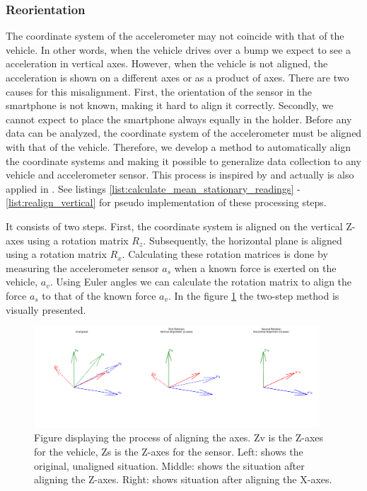 \subsubsection{Reorientation}
\label{sec:reorientation}

The coordinate system of the accelerometer may not coincide with that of the vehicle. In other words, when the vehicle drives over a bump we expect to see a acceleration in vertical axes. However, when the vehicle is not aligned, the acceleration is shown on a different axes or as a product of axes. There are two causes for this misalignment. First, the orientation of the sensor in the smartphone is not known, making it hard to align it correctly. Secondly, we cannot expect to place the smartphone always equally in the holder. Before any data can be analyzed, the coordinate system of the accelerometer must be aligned with that of the vehicle. Therefore, we develop a method to automatically align the coordinate systems and making it possible to generalize data collection to any vehicle and accelerometer sensor. This process is inspired by  and actually is also applied in . See listings \ref{list:calculate_mean_stationary_readings} - \ref{list:realign_vertical} for pseudo implementation of these processing steps.

It consists of two steps. First, the coordinate system is aligned on the vertical Z-axes using a rotation matrix $R_z$. Subsequently, the horizontal plane is aligned using a rotation matrix $R_x$. Calculating these rotation matrices is done by measuring the accelerometer sensor $a_s$ when a known force is exerted on the vehicle, $a_v$. Using Euler angles we can calculate the rotation matrix to align the force $a_s$ to that of the known force $a_v$. In the figure \ref{fig:align-vectors} the two-step method is visually presented.


\begin{figure}[H]
\begin{center}
\includegraphics[width=0.95\textwidth,keepaspectratio]{images/4_data/accelerometer-alignment.png}
\end{center}
\captionsetup{width=.90\textwidth}
\caption{Figure displaying the process of aligning the axes. Zv is the Z-axes for the vehicle, Zs is the Z-axes for the sensor. Left: shows the original, unaligned situation. Middle: shows the situation after aligning the Z-axes. Right: shows situation after aligning the X-axes.}
\label{fig:align-vectors}
\end{figure}


